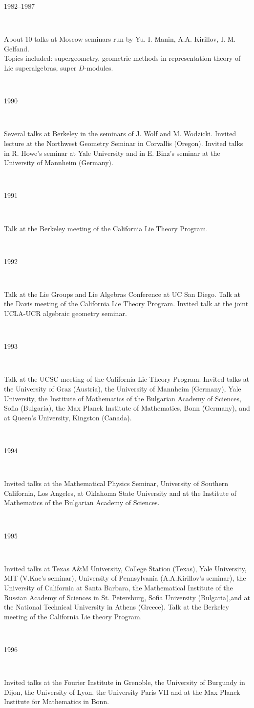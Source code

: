 \documentclass[11pt]{amsart}
\begin{document}
\newcommand{\tcc}[2]{\noindent\parbox[t]{40mm}{#1}\
\parbox[t]{105mm}{#2}\\
}


\medskip

\tcc{1982--1987}{About 10 talks at Moscow seminars run by Yu. I. Manin,
A.A. Kirillov, I. M. Gelfand.\\
Topics included:  supergeometry, geometric methods
in representation theory of Lie superalgebras, super
$D$-modules.\\}
\tcc{1990}{Several talks at Berkeley in the seminars of J. Wolf and M.
Wodzicki.  Invited lecture at the Northwest Geometry
Seminar in Corvallis (Oregon). Invited talks in R. Howe's seminar
at Yale University and in E. Binz's seminar  at
the University of Mannheim (Germany).\\}
\tcc{1991}{Talk at the Berkeley meeting of the California Lie Theory
Program.\\}
\tcc{1992}{Talk at the Lie Groups and Lie Algebras Conference at UC San
Diego. Talk at the Davis meeting of the California Lie Theory Program.
Invited talk at the joint UCLA-UCR algebraic geometry seminar.\\}
\tcc{1993}{Talk at the UCSC meeting of the California
Lie Theory Program. Invited talks at the University of Graz (Austria), the
University of Mannheim (Germany), Yale University, the Institute of
Mathematics of the Bulgarian Academy of Sciences, Sofia (Bulgaria),
the Max Planck Institute of Mathematics, Bonn (Germany), and at Queen's
University, Kingston (Canada).\\}
\tcc{1994}{Invited talks at the Mathematical Physics Seminar,
University of Southern California, Los Angeles, at Oklahoma State
University and at the Institute of Mathematics of the Bulgarian Academy of
Sciences.\\}
\tcc{1995}{Invited talks at Texas A\&M University,
College Station (Texas), Yale University, MIT (V.Kac's
seminar), University of Pennsylvania (A.A.Kirillov's
seminar), the University of California at Santa Barbara, the
Mathematical Institute of the Russian Academy of Sciences in
St. Petersburg, Sofia University (Bulgaria),and at the
National Technical University in Athens (Greece). Talk at the Berkeley
meeting of the California Lie theory Program.\\}
\tcc{1996}{Invited talks at the Fourier Institute
in Grenoble, the University of Burgundy in Dijon, the
University of Lyon, the University Paris VII and at the
Max Planck Institute for Mathematics in Bonn.\\}
\end{document}
